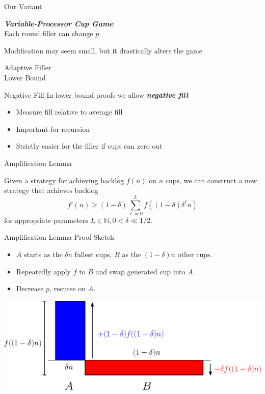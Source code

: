 \documentclass[xcolor=x11names, svgnames, rgb]{beamer}
\newcommand{\defn}[1]       {{\textit{\textbf{\boldmath #1}}}}
\begin{document}
\begin{frame}[t]{Our Variant}
  \begin{definition}
    \defn{Variable-Processor Cup Game}: \\
    Each round filler can change $p$ 
  \end{definition}

\vspace{1cm}
Modification may seem small, but it drastically alters the game

\end{frame}

\begin{frame}[c]{}
\begin{center}
\Huge Adaptive Filler\\ Lower Bound
\end{center}
\end{frame}

\begin{frame}[t]{Negative Fill}
  In lower bound proofs we allow \defn{negative fill}
  \begin{itemize}
    \item Measure fill relative to average fill
    \item Important for recursion 
    \item Strictly easier for the filler if cups can zero out
  \end{itemize}
\end{frame}

\begin{frame}[t]{Amplification Lemma}
  \begin{lemma}
    Given a strategy for achieving backlog $f(n)$ on $n$ cups, we can construct a new strategy that achieves backlog 
    $$f'(n) \ge (1-\delta)\sum_{\ell=0}^L f((1-\delta)\delta^\ell n)$$
    for appropriate parameters $L\in\mathbb{N}, 0<\delta\ll 1/2$.
  \end{lemma}
\end{frame}

\begin{frame}[t]{Amplification Lemma Proof Sketch}
  \begin{itemize}
    \item $A$ starts as the $\delta n$ fullest cups, $B$ as the $(1-\delta)n$ other cups.
    \item Repeatedly apply $f$ to $B$ and swap generated cup into $A$. 
    \item Decrease $p$, recurse on $A$.
  \end{itemize} 
  \vspace{0.5cm}
  \includegraphics[width=\linewidth]{amplificationImgs/delta_one_minus_delta.eps}
\end{frame}
\end{document}
